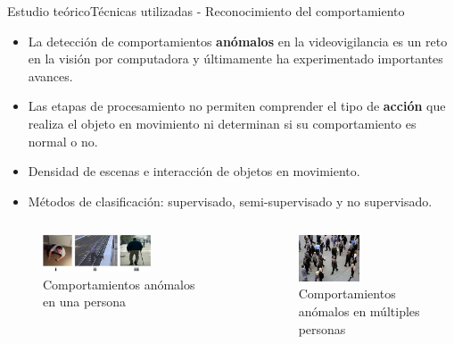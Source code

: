 
\begin{frame}{Estudio teórico}{Técnicas utilizadas - Reconocimiento del comportamiento}

\begin{itemize}
    \justifying
    \item La detección de comportamientos \textbf{anómalos} en la videovigilancia es un reto en la visión por computadora y últimamente ha experimentado importantes avances.
    \item Las etapas de procesamiento no permiten comprender el tipo de \textbf{acción} que realiza el objeto en movimiento ni determinan si su
comportamiento es normal o no.
    \item Densidad de escenas e interacción de objetos en movimiento.
    \item Métodos de clasificación: supervisado, semi-supervisado y no supervisado.
\end{itemize}

\begin{columns}

  \begin{column}{0.5\textwidth}
    \begin{figure}[ht]
    \centering
    \includegraphics[width=0.65\textwidth]{Images/estudio-teorico/Abnormal-behaviors-single-person.jpg}
    \caption{\label{fig:Abnormal-behaviors-single-person}Comportamientos anómalos en una persona}
    \end{figure}
  \end{column}
  
  \begin{column}{0.5\textwidth}  %
    \begin{figure}[ht]
    \centering
    \includegraphics[width=0.5\textwidth]{Images/estudio-teorico/abnormal-behaviors-crowded-scene.jpg}
    \caption{\label{abnormal-behaviors-crowded-scene}Comportamientos anómalos en múltiples personas}
    \end{figure}    
  \end{column}
  
\end{columns}

\end{frame}

